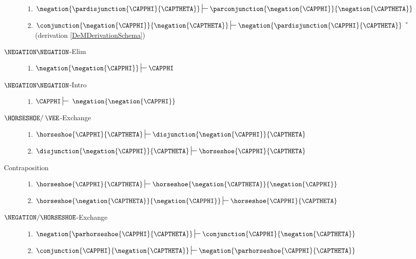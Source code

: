 \begin{multicols}{2}
\begin{description}
\begin{enumerate}[start=6]
\item ${\negation{\pardisjunction{\CAPPHI}{\CAPTHETA}}}\sststile{}{}{\parconjunction{\negation{\CAPPHI}}{\negation{\CAPTHETA}}}$ 
\item ${\conjunction{\negation{\CAPPHI}}{\negation{\CAPTHETA}}}\sststile{}{}{\negation{\pardisjunction{\CAPPHI}{\CAPTHETA}}}$ $^*$ (derivation \ref{DeMDerivationSchema})
\end{enumerate}
\item[$\NEGATION\NEGATION$-Elim]\hfill{}
\begin{enumerate}[start=10]
\item $\negation{\negation{\CAPPHI}}\sststile{}{}\CAPPHI$
\end{enumerate}
\item[$\NEGATION\NEGATION$-Intro]\hfill{}
\begin{enumerate}[start=11]
\item $\CAPPHI\sststile{}{}\;\negation{\negation{\CAPPHI}}$
\end{enumerate}
\item[$\HORSESHOE/\:\VEE$-Exchange]\hfill{}
\begin{enumerate}[start=12]
\item ${\horseshoe{\CAPPHI}{\CAPTHETA}}\sststile{}{}{\disjunction{\negation{\CAPPHI}}{\CAPTHETA}}$
\item ${\disjunction{\negation{\CAPPHI}}{\CAPTHETA}}\sststile{}{}{\horseshoe{\CAPPHI}{\CAPTHETA}}$
\end{enumerate}
\item[Contraposition]\hfill{}
\begin{enumerate}[start=14]
\item $\horseshoe{\CAPPHI}{\CAPTHETA}\sststile{}{}\horseshoe{\negation{\CAPTHETA}}{\negation{\CAPPHI}}$
\item $\horseshoe{\negation{\CAPTHETA}}{\negation{\CAPPHI}}\sststile{}{}\horseshoe{\CAPPHI}{\CAPTHETA}$
\end{enumerate}
\item[$\NEGATION/\HORSESHOE$-Exchange]\hfill{}
\begin{enumerate}[start=16]
\item ${\negation{\parhorseshoe{\CAPPHI}{\CAPTHETA}}}\sststile{}{}{\conjunction{\CAPPHI}{\negation{\CAPTHETA}}}$
\item ${\conjunction{\CAPPHI}{\negation{\CAPTHETA}}}\sststile{}{}{\negation{\parhorseshoe{\CAPPHI}{\CAPTHETA}}}$
\end{enumerate}
\end{description}
\end{multicols}
